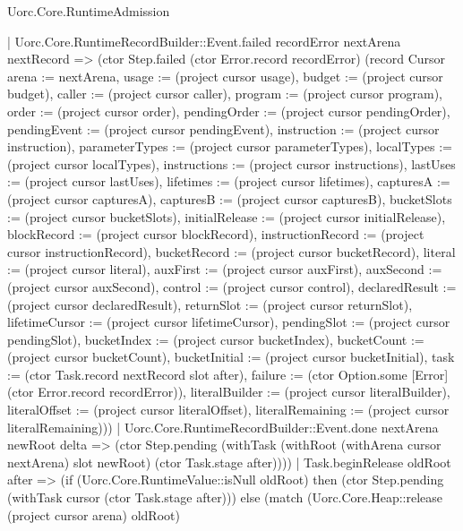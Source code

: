 \begin{lexlean}{Uorc.Core.RuntimeAdmission}
\begin{semanticmodule}
{      | Uorc.Core.RuntimeRecordBuilder::Event.failed recordError nextArena nextRecord => (ctor Step.failed (ctor Error.record recordError) (record Cursor {arena := nextArena, usage := (project cursor usage), budget := (project cursor budget), caller := (project cursor caller), program := (project cursor program), order := (project cursor order), pendingOrder := (project cursor pendingOrder), pendingEvent := (project cursor pendingEvent), instruction := (project cursor instruction), parameterTypes := (project cursor parameterTypes), localTypes := (project cursor localTypes), instructions := (project cursor instructions), lastUses := (project cursor lastUses), lifetimes := (project cursor lifetimes), capturesA := (project cursor capturesA), capturesB := (project cursor capturesB), bucketSlots := (project cursor bucketSlots), initialRelease := (project cursor initialRelease), blockRecord := (project cursor blockRecord), instructionRecord := (project cursor instructionRecord), bucketRecord := (project cursor bucketRecord), literal := (project cursor literal), auxFirst := (project cursor auxFirst), auxSecond := (project cursor auxSecond), control := (project cursor control), declaredResult := (project cursor declaredResult), returnSlot := (project cursor returnSlot), lifetimeCursor := (project cursor lifetimeCursor), pendingSlot := (project cursor pendingSlot), bucketIndex := (project cursor bucketIndex), bucketCount := (project cursor bucketCount), bucketInitial := (project cursor bucketInitial), task := (ctor Task.record nextRecord slot after), failure := (ctor Option.some [Error] (ctor Error.record recordError)), literalBuilder := (project cursor literalBuilder), literalOffset := (project cursor literalOffset), literalRemaining := (project cursor literalRemaining)}))
      | Uorc.Core.RuntimeRecordBuilder::Event.done nextArena newRoot delta => (ctor Step.pending (withTask (withRoot (withArena cursor nextArena) slot newRoot) (ctor Task.stage after))))
    | Task.beginRelease oldRoot after => (if (Uorc.Core.RuntimeValue::isNull oldRoot) then (ctor Step.pending (withTask cursor (ctor Task.stage after))) else (match (Uorc.Core.Heap::release (project cursor arena) oldRoot)
}
\end{semanticmodule}
\end{lexlean}

